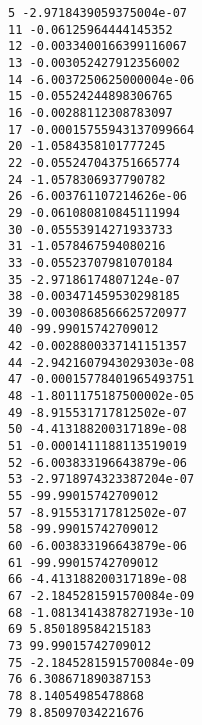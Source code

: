 \documentclass[11pt]{article}
\begin{document}
    \begin{Verbatim}[commandchars=\\\{\}]
5 -2.9718439059375004e-07
11 -0.06125964444145352
12 -0.0033400166399116067
13 -0.003052427912356002
14 -6.0037250625000004e-06
15 -0.05524244898306765
16 -0.00288112308783097
17 -0.00015755943137099664
20 -1.0584358101777245
22 -0.055247043751665774
24 -1.0578306937790782
26 -6.003761107214626e-06
29 -0.061080810845111994
30 -0.05553914271933733
31 -1.0578467594080216
33 -0.05523707981070184
35 -2.97186174807124e-07
38 -0.003471459530298185
39 -0.0030868566625720977
40 -99.99015742709012
42 -0.0028800337141151357
44 -2.9421607943029303e-08
47 -0.00015778401965493751
48 -1.8011175187500002e-05
49 -8.915531717812502e-07
50 -4.413188200317189e-08
51 -0.0001411188113519019
52 -6.003833196643879e-06
53 -2.9718974323387204e-07
55 -99.99015742709012
57 -8.915531717812502e-07
58 -99.99015742709012
60 -6.003833196643879e-06
61 -99.99015742709012
66 -4.413188200317189e-08
67 -2.1845281591570084e-09
68 -1.0813414387827193e-10
69 5.850189584215183
73 99.99015742709012
75 -2.1845281591570084e-09
76 6.308671890387153
78 8.14054985478868
79 8.85097034221676

    \end{Verbatim}


    
    
    
    
\end{document}
